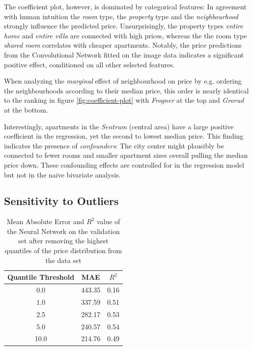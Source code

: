 \documentclass[12pt, letterpaper]{article}
\begin{document}
The coefficient plot, however, is dominated by categorical features:
In agreement with human intuition the \emph{room} type, the \emph{property} type and the \emph{neighbourhood} strongly influence the predicted price.
Unsurprisingly, the property types \emph{entire home} and \emph{entire villa} are connected with high prices, whereas the the room type \emph{shared room} correlates with cheaper apartments.
Notably, the price predictions from the Convolutional Network fitted on the image data indicates a significant positive effect, conditioned on all other selected features.

When analyzing the \emph{marginal} effect of neighbourhood on price by e.g. ordering the neighbourhoods according to their median price, this order is nearly identical to the ranking in figure \ref{fig:coefficient-plot} with \emph{Frogner} at the top and \emph{Grorud} at the bottom.

Interestingly, apartments in the \emph{Sentrum} (central area) have a large positive coefficient in the regression, yet the second to lowest median price.
This finding indicates the presence of \emph{confounders}:
The city center might plausibly be connected to fewer rooms and smaller apartment sizes overall pulling the median price down.
These confounding effects are controlled for in the regression model but not in the naive bivariate analysis.


\subsection{Sensitivity to Outliers}

\begin{table}[t]
    \centering
    \begin{tabular}{@{}ccc@{}}
        \toprule
        \textbf{Quantile Threshold} & \textbf{MAE} & \textbf{$R^2$} \\ \midrule
        0.0                         & 443.35       & 0.16           \\
        1.0                         & 337.59       & 0.51           \\
        2.5                         & 282.17       & 0.53           \\
        5.0                         & 240.57       & 0.54           \\
        10.0                        & 214.76       & 0.49           \\ \bottomrule
    \end{tabular}
    \caption{Mean Absolute Error and $R^2$ value of the Neural Network on the validation set after removing the highest quantiles of the price distribution from the data set}
    \label{tab:mlp-outliers}
\end{table}
\end{document}
